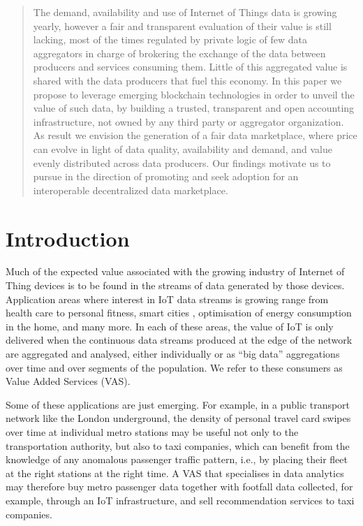 \documentclass[chi_draft]{sigchi}
\begin{document}
\begin{abstract}
The demand, availability and use of Internet of Things data is growing yearly, however a fair and transparent evaluation of their value is still lacking, most of the times regulated by private logic of few data aggregators in charge of brokering the exchange of the data between producers and services consuming them. Little of this aggregated value is shared with the data producers that fuel this economy. In this paper we propose to leverage emerging blockchain technologies in order to unveil the value of such data, by building a trusted, transparent and open accounting infrastructure, not owned by any third party or aggregator organization. As result we envision the generation of a fair data marketplace, where price can evolve in light of data quality, availability and demand, and value evenly distributed across data producers. Our findings motivate us to pursue in the direction of promoting and seek adoption for an interoperable decentralized data marketplace.
\end{abstract}

\section{Introduction}
Much of the expected value associated with the growing industry of Internet of Thing devices \cite{7004800} is to be found in the streams of data generated by those devices.
Application areas where interest in IoT data streams is growing range from health care \cite{7113786} to personal fitness, smart cities \cite{Perera2014}, optimisation of energy consumption in the home, and many more.
In each of these areas, the value of IoT is only delivered when the continuous data streams produced at the edge of the network are aggregated and analysed, either individually or as ``big data'' aggregations over time and over segments of the population.  We refer to these consumers as Value Added Services (VAS).

Some of these applications are just emerging.
For example, in a public transport network like the London underground, the density of personal travel card swipes over time at individual metro stations may be
useful not only to the transportation authority, but also to taxi companies, which can benefit from the knowledge of any anomalous passenger traffic pattern, i.e., by placing their fleet at the right stations at the right time. A VAS that specialises in data analytics may therefore buy metro passenger data together with footfall data collected, for example, through an IoT infrastructure, and sell
recommendation services to taxi companies.
\end{document}
